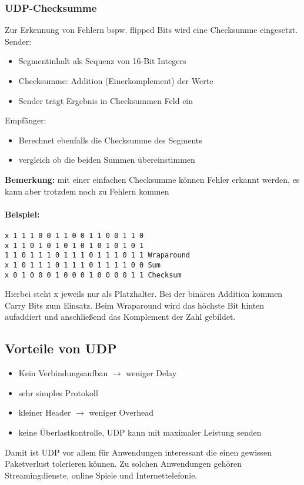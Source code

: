 \subsubsection{UDP-Checksumme}
Zur Erkennung von Fehlern bspw. flipped Bits wird eine Checksumme eingesetzt.\\
\noindent Sender:
\begin{itemize}
    \item Segmentinhalt als Sequenz von 16-Bit Integers
    \item Checksumme: Addition (Einerkomplement) der Werte
    \item Sender trägt Ergebnis in Checksummen Feld ein
\end{itemize}
\noindent Empfänger:
\begin{itemize}
    \item Berechnet ebenfalls die Checksumme des Segments
    \item vergleich ob die beiden Summen übereinstimmen
\end{itemize}
\noindent \textbf{Bemerkung:} mit einer einfachen Checksumme können Fehler erkannt werden, es kann aber trotzdem noch zu Fehlern kommen\\
\paragraph{Beispiel:}
\begin{lstlisting}
x 1 1 1 0 0 1 1 0 0 1 1 0 0 1 1 0
x 1 1 0 1 0 1 0 1 0 1 0 1 0 1 0 1
1 1 0 1 1 1 0 1 1 1 0 1 1 1 0 1 1 Wraparound
x 1 0 1 1 1 0 1 1 1 0 1 1 1 1 0 0 Sum
x 0 1 0 0 0 1 0 0 0 1 0 0 0 0 1 1 Checksum
\end{lstlisting}

Hierbei steht x jeweils nur als Platzhalter. Bei der binären Addition kommen Carry Bits zum Einsatz. Beim Wraparound wird das höchste Bit hinten aufaddiert und anschließend das Komplement der Zahl gebildet.

\subsection{Vorteile von UDP}
\begin{itemize}
    \item Kein Verbindungsaufbau $\rightarrow$ weniger Delay
    \item sehr simples Protokoll
    \item kleiner Header $\rightarrow$ weniger Overhead
    \item keine Überlastkontrolle, UDP kann mit maximaler Leistung senden
\end{itemize}
Damit ist UDP vor allem für Anwendungen interessant die einen gewissen Paketverlust tolerieren können. Zu solchen Anwendungen gehören Streamingdienste, online Spiele und Internettelefonie.

